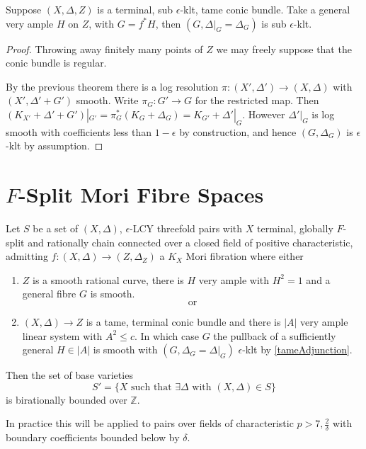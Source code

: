 \begin{corollary}\label{tameAdjunction}
	Suppose $(X,\Delta,Z)$ is a terminal, sub $\epsilon$-klt, tame conic bundle. Take a general very ample $H$ on $Z$, with $G=f^{*}H$, then
	 $(G,\Delta|_{G}=\Delta_{G})$ is sub $\epsilon$-klt.
\end{corollary}
\begin{proof}
	Throwing away finitely many points of $Z$ we may freely suppose that the conic bundle is regular.
	
	By the previous theorem there is a log resolution $\pi\colon (X',\Delta') \to (X,\Delta)$ with $(X',\Delta'+G')$ smooth. Write $\pi_{G}\colon G' \to G$ for the restricted map. Then $(K_{X'}+\Delta'+G')|_{G'}=\pi_{G}^{*}(K_{G}+\Delta_{G})=K_{G'}+\Delta'|_{G}$. However $\Delta'|_{G}$ is log smooth with coefficients less than $1-\epsilon$ by construction, and hence $(G,\Delta_{G})$ is $\epsilon$-klt by assumption. 
\end{proof}


	
\section{$F$-Split Mori Fibre Spaces}

\begin{theorem}\label{setup}
	Let $S$ be a set of $(X,\Delta)$, $\epsilon$-LCY threefold pairs with $X$ terminal, globally $F$-split and rationally chain connected over a closed field of positive characteristic, admitting $f\colon (X,\Delta) \to (Z,\Delta_{Z})$ a $K_{X}$ Mori fibration where either
	\begin{enumerate}
		\item $Z$ is a smooth rational curve, there is $H$ very ample with $H^{2}=1$ and a general fibre $G$ is smooth.\\
		\[\text{or}\]
		\item $(X,\Delta) \to Z$ is a tame, terminal conic bundle and there is $|A|$ very ample linear system with $A^{2} \leq c$. In which case $G$ the pullback of a sufficiently general $H \in |A|$ is smooth with $(G,\Delta_{G}=\Delta|_{G})$ $\epsilon$-klt by \autoref{tameAdjunction}.
	\end{enumerate}
	Then the set of base varieties $$S'=\{X \text{ such that } \exists \Delta \text{ with } (X,\Delta) \in S\}$$ is birationally bounded over $\mathbb{Z}$. 
\end{theorem}

\begin{remark}
	In practice this will be applied to pairs over fields of characteristic $p > 7,\frac{2}{\delta}$ with boundary coefficients bounded below by $\delta$.
\end{remark}

